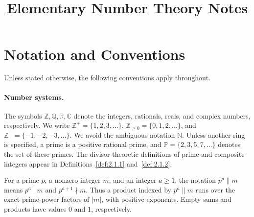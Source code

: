 \documentclass[11pt]{article}
\title{Elementary Number Theory Notes}
\author{}
\date{}
\theoremstyle{ntstyle}
\newcommand{\Primes}{\mathbb{P}}
\begin{document}
\maketitle
\clearpage
\begingroup
\setlength{\parskip}{0pt}
\tableofcontents
\endgroup
\clearpage

\section*{Notation and Conventions}

\noindent Unless stated otherwise, the following conventions apply throughout.

\paragraph*{Number systems.}
The symbols $\mathbb{Z},\mathbb{Q},\mathbb{R},\mathbb{C}$ denote the integers, rationals, reals, and complex numbers, respectively.
We write $\mathbb{Z}^+=\{1,2,3,\ldots\}$, $\mathbb{Z}_{\ge0}=\{0,1,2,\ldots\}$, and $\mathbb{Z}^-=\{-1,-2,-3,\ldots\}$.
We avoid the ambiguous notation $\mathbb{N}$.
Unless another ring is specified, a prime is a positive rational prime, and $\Primes=\{2,3,5,7,\ldots\}$ denotes the set of these primes.
The divisor-theoretic definitions of prime and composite integers appear in Definitions~\ref{def:2.1.1} and~\ref{def:2.1.2}.

For a prime $p$, a nonzero integer $m$, and an integer $a\ge1$, the notation $p^a\parallel m$ means $p^a\mid m$ and $p^{a+1}\nmid m$. Thus a product indexed by $p^a\parallel m$ runs over the exact prime-power factors of $|m|$, with positive exponents. Empty sums and products have values $0$ and $1$, respectively.
\end{document}
